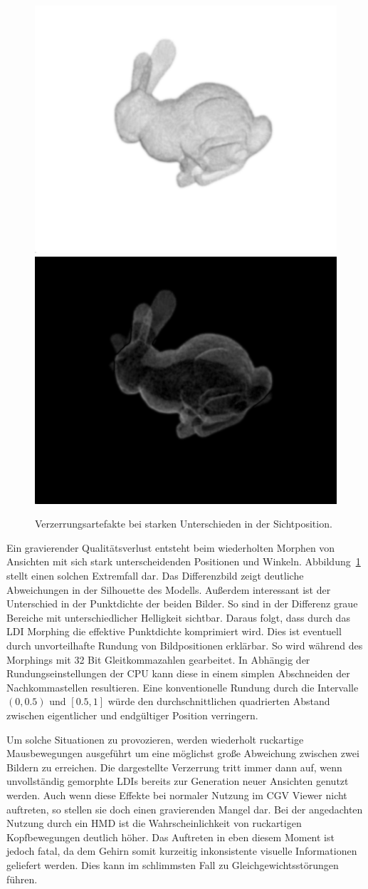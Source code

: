 \documentclass[hyperref, beleg, german]{cgvpub}
\begin{document}
\begin{figure}
	\includegraphics[width = .48\linewidth]{images/distortion/241_filtered}
	\includegraphics[width = .48\linewidth]{images/distortion/diff}
	\caption{Verzerrungsartefakte bei starken Unterschieden in der Sichtposition.}%
	\label{img:distortion}
\end{figure}

Ein gravierender Qualitätsverlust entsteht beim wiederholten Morphen von
Ansichten mit sich stark unterscheidenden Positionen und Winkeln.
Abbildung~\ref{img:distortion} stellt einen solchen Extremfall dar. Das
Differenzbild zeigt deutliche Abweichungen in der Silhouette des Modells.
Außerdem interessant ist der Unterschied in der Punktdichte der beiden Bilder.
So sind in der Differenz graue Bereiche mit unterschiedlicher Helligkeit
sichtbar. Daraus folgt, dass durch das LDI Morphing die effektive Punktdichte
komprimiert wird. Dies ist eventuell durch unvorteilhafte Rundung von
Bildpositionen erklärbar. So wird während des Morphings mit 32 Bit
Gleitkommazahlen gearbeitet. In Abhängig der Rundungseinstellungen der CPU kann
diese in einem simplen Abschneiden der Nachkommastellen resultieren. Eine
konventionelle Rundung durch die Intervalle \( \left(0, 0.5\right) \) und \(
\left[0.5, 1\right] \) würde den durchschnittlichen quadrierten Abstand
zwischen eigentlicher und endgültiger Position verringern.

Um solche Situationen zu provozieren, werden wiederholt
ruckartige Mausbewegungen ausgeführt um eine möglichst große Abweichung
zwischen zwei Bildern zu erreichen. Die dargestellte Verzerrung tritt immer
dann auf, wenn unvollständig gemorphte LDIs bereits zur Generation neuer
Ansichten genutzt werden. Auch wenn diese Effekte bei normaler Nutzung im CGV
Viewer nicht auftreten, so stellen sie doch einen gravierenden Mangel dar. Bei
der angedachten Nutzung durch ein HMD ist die Wahrscheinlichkeit von
ruckartigen Kopfbewegungen deutlich höher. Das Auftreten in eben diesem Moment
ist jedoch fatal, da dem Gehirn somit kurzeitig inkonsistente visuelle
Informationen geliefert werden. Dies kann im schlimmsten Fall zu
Gleichgewichtsstörungen führen.
\end{document}
